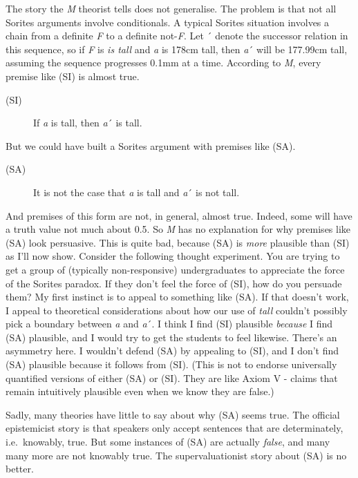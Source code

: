 \documentclass[
  10pt,
  letterpaper,
  DIV=11,
  numbers=noendperiod,
  twoside]{scrartcl}
\begin{document}
The story the \emph{M} theorist tells does not generalise. The problem
is that not all Sorites arguments involve conditionals. A typical
Sorites situation involves a chain from a definite \emph{F} to a
definite not-\emph{F}. Let ´ denote the successor relation in this
sequence, so if \emph{F} is \emph{is tall} and \emph{a} is 178cm tall,
then \emph{a}´ will be 177.99cm tall, assuming the sequence progresses
0.1mm at a time. According to \emph{M}, every premise like (SI) is
almost true.

\begin{description}
\item[(SI)]
If \emph{a} is tall, then \emph{a}´ is tall.
\end{description}

But we could have built a Sorites argument with premises like (SA).

\begin{description}
\item[(SA)]
It is not the case that \emph{a} is tall and \emph{a}´ is not tall.
\end{description}

And premises of this form are not, in general, almost true. Indeed, some
will have a truth value not much about 0.5. So \emph{M} has no
explanation for why premises like (SA) look persuasive. This is quite
bad, because (SA) is \emph{more} plausible than (SI) as I'll now show.
Consider the following thought experiment. You are trying to get a group
of (typically non-responsive) undergraduates to appreciate the force of
the Sorites paradox. If they don't feel the force of (SI), how do you
persuade them? My first instinct is to appeal to something like (SA). If
that doesn't work, I appeal to theoretical considerations about how our
use of \emph{tall} couldn't possibly pick a boundary between \emph{a}
and \emph{a}´. I think I find (SI) plausible \emph{because} I find (SA)
plausible, and I would try to get the students to feel likewise. There's
an asymmetry here. I wouldn't defend (SA) by appealing to (SI), and I
don't find (SA) plausible because it follows from (SI). (This is not to
endorse universally quantified versions of either (SA) or (SI). They are
like Axiom V - claims that remain intuitively plausible even when we
know they are false.)

Sadly, many theories have little to say about why (SA) seems true. The
official epistemicist story is that speakers only accept sentences that
are determinately, i.e.~knowably, true. But some instances of (SA) are
actually \emph{false}, and many many more are not knowably true. The
supervaluationist story about (SA) is no better.
\end{document}
